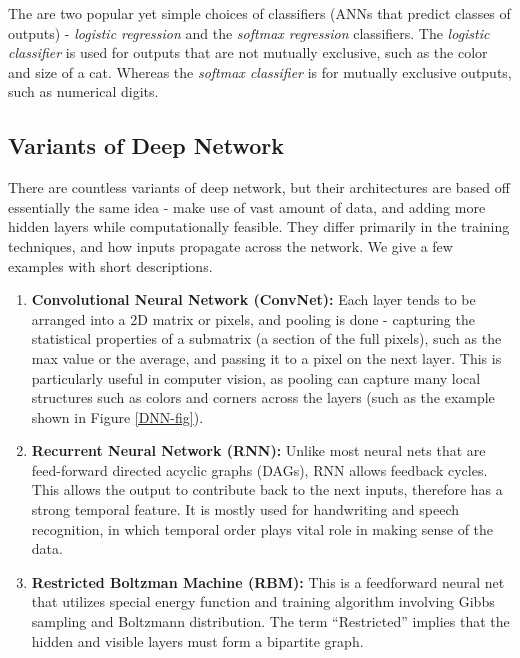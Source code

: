 \documentclass[12pt]{article}  %
\begin{document}
The are two popular yet simple choices of classifiers (ANNs that predict classes of outputs) - \emph{logistic regression} and the \emph{softmax regression} classifiers. The \emph{logistic classifier} is used for outputs that are not mutually exclusive, such as the color and size of a cat. Whereas the \emph{softmax classifier} is for mutually exclusive outputs, such as numerical digits.



\subsection{Variants of Deep Network}

There are countless variants of deep network, but their architectures are based off essentially the same idea - make use of vast amount of data, and adding more hidden layers while computationally feasible. They differ primarily in the training techniques, and how inputs propagate across the network. We give a few examples with short descriptions.

\begin{enumerate}
	\item {\bf Convolutional Neural Network (ConvNet):} Each layer tends to be arranged into a 2D matrix or pixels, and pooling is done - capturing the statistical properties of a submatrix (a section of the full pixels), such as the max value or the average, and passing it to a pixel on the next layer. This is particularly useful in computer vision, as pooling can capture many local structures such as colors and corners across the layers (such as the example shown in Figure \ref{DNN-fig}).
	\item {\bf Recurrent Neural Network (RNN):} Unlike most neural nets that are feed-forward directed acyclic graphs (DAGs), RNN allows feedback cycles. This allows the output to contribute back to the next inputs, therefore has a strong temporal feature. It is mostly used for handwriting and speech recognition, in which temporal order plays vital role in making sense of the data.
	\item {\bf Restricted Boltzman Machine (RBM):} This is a feedforward neural net that utilizes special energy function and training algorithm involving Gibbs sampling and Boltzmann distribution. The term ``Restricted'' implies that the hidden and visible layers must form a bipartite graph.
\end{enumerate}
\end{document}
